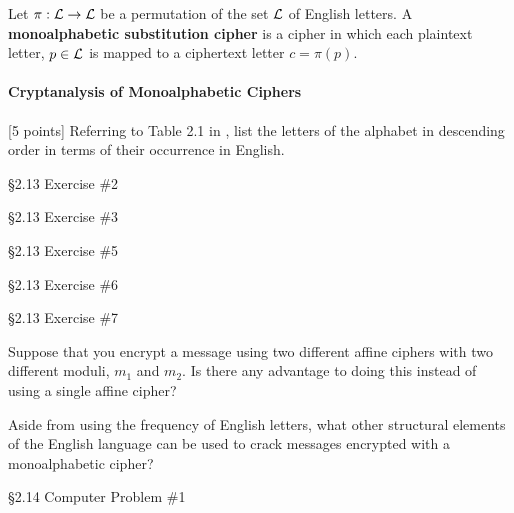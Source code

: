 	\begin{definition}
		Let $\pi:\mathcal{L}\to\mathcal{L}$ be a permutation of the set $\mathcal{L}$ of English letters. A {\bf monoalphabetic substitution cipher} is a cipher in which each plaintext letter, $p\in\mathcal{L}$ is mapped to a ciphertext letter $c = \pi(p)$.
	\end{definition}

		\paragraph*{Cryptanalysis of Monoalphabetic Ciphers}

\begin{problem}
\label{prob-freq} [5 points]
Referring to Table 2.1 in \cite{tw}, list the letters of the alphabet in descending order in terms of their occurrence in English.
\end{problem}

\begin{problem} [10 points]
\S 2.13 Exercise \#2
\end{problem}

\begin{problem} [10 points]
\S 2.13 Exercise \#3
\end{problem}

\begin{problem} [10 points]
\S 2.13 Exercise \#5
\end{problem}

\begin{problem} [15 points]
\S 2.13 Exercise \#6
\end{problem}

\begin{problem} [15 points]
\S 2.13 Exercise \#7
\end{problem}

\begin{problem} [15 points]
Suppose that you encrypt a message using two different affine ciphers with two different moduli, $m_1$ and $m_2$. Is there any advantage to doing this instead of using a single affine cipher?
\end{problem}

\begin{problem} [10 points]
Aside from using the frequency of English letters, what other structural elements of the English language can be used to crack messages encrypted with a monoalphabetic cipher?
\end{problem}

\begin{problem} [10 points]
\S 2.14 Computer Problem \#1
\end{problem}

